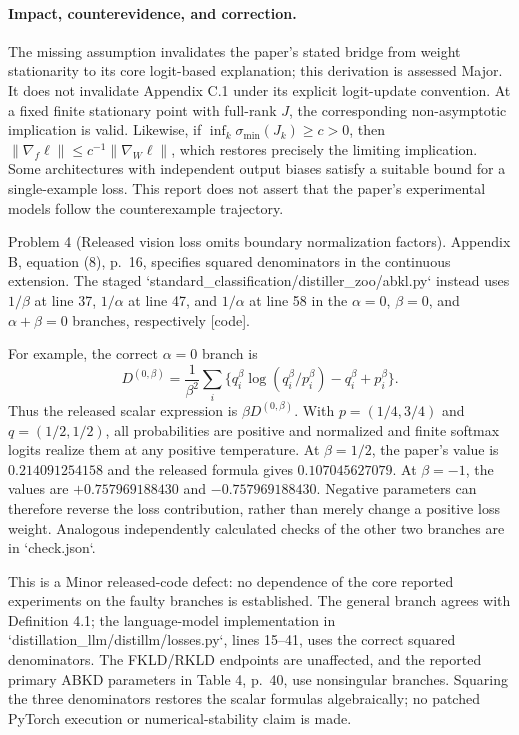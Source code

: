 \documentclass[10pt]{article}
\begin{document}
\paragraph*{Impact, counterevidence, and correction.}\mbox{}\par
The missing assumption invalidates the paper’s stated bridge from weight stationarity to its core logit-based explanation; this derivation is assessed Major. It does not invalidate Appendix C.1 under its explicit logit-update convention. At a fixed finite stationary point with full-rank \(J\), the corresponding non-asymptotic implication is valid. Likewise, if \(\inf_k\sigma_{\min}(J_k)\ge c>0\), then \(\|\nabla_f\ell\|\le c^{-1}\|\nabla_W\ell\|\), which restores precisely the limiting implication. Some architectures with independent output biases satisfy a suitable bound for a single-example loss. This report does not assert that the paper’s experimental models follow the counterexample trajectory.\par
Problem 4 (Released vision loss omits boundary normalization factors).  Appendix B, equation (8), p. 16, specifies squared denominators in the continuous extension. The staged `standard\_classification/distiller\_zoo/abkl.py` instead uses \(1/\beta\) at line 37, \(1/\alpha\) at line 47, and \(1/\alpha\) at line 58 in the \(\alpha=0\), \(\beta=0\), and \(\alpha+\beta=0\) branches, respectively [code].\par
For example, the correct \(\alpha=0\) branch is \[D^{(0,\beta)}=\frac1{\beta^2}
\sum_i\{q_i^\beta\log(q_i^\beta/p_i^\beta)-q_i^\beta+p_i^\beta\}.\] Thus the released scalar expression is \(\beta D^{(0,\beta)}\). With \(p=(1/4,3/4)\) and \(q=(1/2,1/2)\), all probabilities are positive and normalized and finite softmax logits realize them at any positive temperature. At \(\beta=1/2\), the paper’s value is \(0.214091254158\) and the released formula gives \(0.107045627079\). At \(\beta=-1\), the values are \(+0.757969188430\) and \(-0.757969188430\). Negative parameters can therefore reverse the loss contribution, rather than merely change a positive loss weight. Analogous independently calculated checks of the other two branches are in `check.json`.\par
This is a Minor released-code defect: no dependence of the core reported experiments on the faulty branches is established. The general branch agrees with Definition 4.1; the language-model implementation in `distillation\_llm/distillm/losses.py`, lines 15–41, uses the correct squared denominators. The FKLD/RKLD endpoints are unaffected, and the reported primary ABKD parameters in Table 4, p. 40, use nonsingular branches. Squaring the three denominators restores the scalar formulas algebraically; no patched PyTorch execution or numerical-stability claim is made.\par
\end{document}
